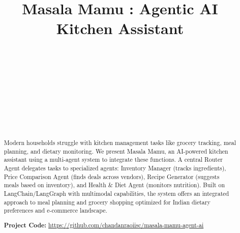 \documentclass{ecai}
\begin{document}

\begin{frontmatter}




\title{Masala Mamu : Agentic AI Kitchen Assistant}

\author[A,B]{~}
\author[A,B]{~}
\author[A,B]{~}
\author[A,B]{~}
\author[A,B]{~}
\address[A]{Division of Interdisciplinary Sciences}
\address[B]{Indian Institute of Science, Bangalore}

\begin{abstract}
Modern households struggle with kitchen management tasks like grocery tracking, meal planning, and dietary monitoring. We present Masala Mamu, an AI-powered kitchen assistant using a multi-agent system to integrate these functions. A central Router Agent delegates tasks to specialized agents: Inventory Manager (tracks ingredients), Price Comparison Agent (finds deals across vendors), Recipe Generator (suggests meals based on inventory), and Health \& Diet Agent (monitors nutrition). Built on LangChain/LangGraph with multimodal capabilities, the system offers an integrated approach to meal planning and grocery shopping optimized for Indian dietary preferences and e-commerce landscape.

\smallskip
\noindent\small{\textbf{Project Code:} \url{https://github.com/chandanraoiisc/masala-mamu-agent-ai}}
\end{abstract}

\end{frontmatter}
\end{document}
